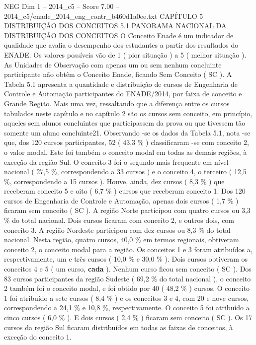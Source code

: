 \begin{textsample}{NEG Dim 1 – 2014\_c5 – Score 7.00 – 2014\_c5/enade\_2014\_eng\_contr\_b460d1a0ee.txt}  \label{ex:f1_neg_336}
CAPÍTULO 5 DISTRIBUIÇÃO DOS CONCEITOS 5.1 PANORAMA NACIONAL DA DISTRIBUIÇÃO DOS CONCEITOS O Conceito Enade é um indicador de qualidade que avalia o desempenho dos estudantes a partir dos resultados do ENADE.
Os valores possíveis vão de 1 ( pior situação ) a 5 ( melhor situação ).
As Unidades de Observação com apenas um ou sem nenhum concluinte participante não obtêm o Conceito Enade, ficando Sem Conceito ( SC ).
A Tabela 5.1 apresenta a quantidade e distribuição de cursos de Engenharia de Controle e Automação participantes do ENADE/2014, por faixa de conceito e Grande Região.
Mais uma vez, ressaltando que a diferença entre os cursos tabulados neste capítulo e no capítulo 2 são os cursos sem conceito, em princípio, aqueles sem alunos concluintes que participassem da prova ou que tivessem tão somente um aluno concluinte21.
Observando -se os dados da Tabela 5.1, nota -se que, dos 120 cursos participantes, 52 ( 43,3 \% ) classificaram -se com conceito 2, o valor modal.
Este foi também o conceito modal em todas as demais regiões, à exceção da região Sul.
O conceito 3 foi o segundo mais frequente em nível nacional ( 27,5 \%, correspondendo a 33 cursos ) e o conceito 4, o terceiro ( 12,5 \%, correspondendo a 15 cursos ).
Houve, ainda, dez cursos ( 8,3 \% ) que receberam conceito 5 e oito ( 6,7 \% ) cursos que receberam conceito 1.
Dos 120 cursos de Engenharia de Controle e Automação, apenas dois cursos ( 1,7 \% ) ficaram sem conceito ( SC ).
A região Norte participou com quatro cursos ou 3,3 \% do total nacional.
Dois cursos ficaram com conceito 2, e outros dois, com conceito 3.
A região Nordeste participou com dez cursos ou 8,3 \% do total nacional.
Nesta região, quatro cursos, 40,0 \% em termos regionais, obtiveram conceito 2, o conceito modal para a região.
Os conceitos 1 e 3 foram atribuídos a, respectivamente, um e três cursos ( 10,0 \% e 30,0 \% ).
Dois cursos obtiveram os conceitos 4 e 5 ( um curso, \textbf{cada} ).
Nenhum curso ficou sem conceito ( SC ).
Dos 83 cursos participantes da região Sudeste ( 69,2 \% do total nacional ), o conceito 2 também foi o conceito modal, e foi obtido por 40 ( 48,2 \% ) cursos.
O conceito 1 foi atribuído a sete cursos ( 8,4 \% ) e os conceitos 3 e 4, com 20 e nove cursos, correspondendo a 24,1 \% e 10,8 \%, respectivamente.
O conceito 5 foi atribuído a cinco cursos ( 6,0 \% ).
E dois cursos ( 2,4 \% ) ficaram sem conceito ( SC ).
Os 17 cursos da região Sul ficaram distribuídos em todas as faixas de conceitos, à exceção do conceito 1.

\end{textsample}
